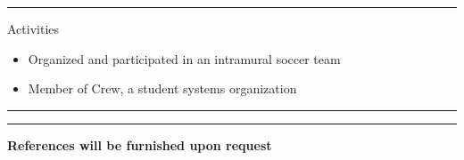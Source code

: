 \documentclass[10pt]{letter}
\begin{document}
\rule{\linewidth}{.5pt}

{\Large Activities}
\begin{itemize}
\setlength\itemsep{1pt}
\item Organized and participated in an intramural soccer team
\item Member of Crew, a student systems organization
\end{itemize}

\rule{\linewidth}{.5pt}

\vspace{-15pt}

\rule{\linewidth}{.5pt}

\begin{center}\textbf{References will be furnished upon request}\end{center}
\end{document}
